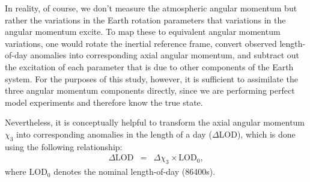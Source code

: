 In reality, of course, we don't measure the atmospheric angular momentum but rather the variations in the Earth rotation parameters that variations in the angular momentum excite. 
To map these to equivalent angular momentum variations, one would rotate the inertial reference frame, convert observed length-of-day anomalies into corresponding axial angular momentum, and subtract out the excitation of each parameter that is due to other components of the Earth system.
For the purposes of this study, however, it is sufficient to assimilate the three angular momentum components directly, since we are performing perfect model experiments and therefore know the true state.

Nevertheless, it is conceptually helpful to transform the axial angular momentum $\chi_3$ into corresponding anomalies in the length of a day ($\Delta$LOD), which is done using the following relationship:
\begin{eqnarray}
\Delta \text{LOD} &=& \Delta \chi_3 \times \text{LOD}_0 ,
\label{eq:X3_to_LOD}
\end{eqnarray}
where $\text{LOD}_0$ denotes the nominal length-of-day (86400s).  

